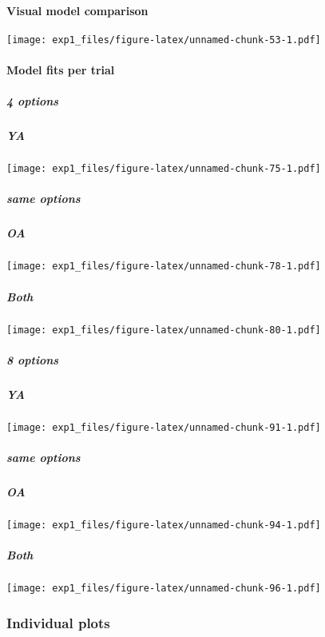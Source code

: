 \documentclass[,]{article}
\let\oldparagraph\paragraph
\renewcommand{\paragraph}[1]{\oldparagraph{#1}\mbox{}}
\let\oldsubparagraph\subparagraph
\renewcommand{\subparagraph}[1]{\oldsubparagraph{#1}\mbox{}}
\begin{document}
\newpage

\paragraph{Visual model comparison}\label{visual-model-comparison}

\texttt{[image: exp1\_files/figure-latex/unnamed-chunk-53-1.pdf]}

\newpage

\paragraph{Model fits per trial}\label{model-fits-per-trial}

\newpage

\subparagraph{4 options}\label{options}

\subparagraph{YA}\label{ya}

\texttt{[image: exp1\_files/figure-latex/unnamed-chunk-75-1.pdf]}

\newpage

\subparagraph{same options}\label{same-options}

\subparagraph{OA}\label{oa}

\texttt{[image: exp1\_files/figure-latex/unnamed-chunk-78-1.pdf]}

\newpage

\subparagraph{Both}\label{both}

\texttt{[image: exp1\_files/figure-latex/unnamed-chunk-80-1.pdf]}

\newpage 

\subparagraph{8 options}\label{options-1}

\subparagraph{YA}\label{ya-1}

\texttt{[image: exp1\_files/figure-latex/unnamed-chunk-91-1.pdf]}

\newpage

\subparagraph{same options}\label{same-options-1}

\subparagraph{OA}\label{oa-1}

\texttt{[image: exp1\_files/figure-latex/unnamed-chunk-94-1.pdf]}

\newpage

\subparagraph{Both}\label{both-1}

\texttt{[image: exp1\_files/figure-latex/unnamed-chunk-96-1.pdf]}

\newpage

\newpage

\subsubsection{Individual plots}\label{individual-plots}
\end{document}
